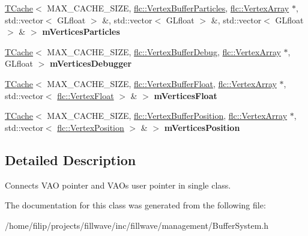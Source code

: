 \begin{DoxyCompactItemize}
\item 
\mbox{\label{structflw_1_1flf_1_1BufferSystem_a75dd883faa9d491424ab2a8dcb75abee}} 
\hyperlink{structflw_1_1flf_1_1TCache}{T\+Cache}$<$ M\+A\+X\+\_\+\+C\+A\+C\+H\+E\+\_\+\+S\+I\+ZE, \hyperlink{classflw_1_1flc_1_1VertexBufferParticles}{flc\+::\+Vertex\+Buffer\+Particles}, \hyperlink{classflw_1_1flc_1_1VertexArray}{flc\+::\+Vertex\+Array} $\ast$, std\+::vector$<$ G\+Lfloat $>$ \&, std\+::vector$<$ G\+Lfloat $>$ \&, std\+::vector$<$ G\+Lfloat $>$ \& $>$ {\bfseries m\+Vertices\+Particles}
\item 
\mbox{\label{structflw_1_1flf_1_1BufferSystem_a36720b705108842100c58f19793c3878}} 
\hyperlink{structflw_1_1flf_1_1TCache}{T\+Cache}$<$ M\+A\+X\+\_\+\+C\+A\+C\+H\+E\+\_\+\+S\+I\+ZE, \hyperlink{classflw_1_1flc_1_1VertexBufferDebug}{flc\+::\+Vertex\+Buffer\+Debug}, \hyperlink{classflw_1_1flc_1_1VertexArray}{flc\+::\+Vertex\+Array} $\ast$, G\+Lfloat $>$ {\bfseries m\+Vertices\+Debugger}
\item 
\mbox{\label{structflw_1_1flf_1_1BufferSystem_a315fe65dc1c97c15215d09627a4d3463}} 
\hyperlink{structflw_1_1flf_1_1TCache}{T\+Cache}$<$ M\+A\+X\+\_\+\+C\+A\+C\+H\+E\+\_\+\+S\+I\+ZE, \hyperlink{classflw_1_1flc_1_1VertexBufferFloat}{flc\+::\+Vertex\+Buffer\+Float}, \hyperlink{classflw_1_1flc_1_1VertexArray}{flc\+::\+Vertex\+Array} $\ast$, std\+::vector$<$ \hyperlink{structflw_1_1flc_1_1VertexFloat}{flc\+::\+Vertex\+Float} $>$ \& $>$ {\bfseries m\+Vertices\+Float}
\item 
\mbox{\label{structflw_1_1flf_1_1BufferSystem_aa90f229de2f3f3237ae6328d170b9dd0}} 
\hyperlink{structflw_1_1flf_1_1TCache}{T\+Cache}$<$ M\+A\+X\+\_\+\+C\+A\+C\+H\+E\+\_\+\+S\+I\+ZE, \hyperlink{classflw_1_1flc_1_1VertexBufferPosition}{flc\+::\+Vertex\+Buffer\+Position}, \hyperlink{classflw_1_1flc_1_1VertexArray}{flc\+::\+Vertex\+Array} $\ast$, std\+::vector$<$ \hyperlink{structflw_1_1flc_1_1VertexPosition}{flc\+::\+Vertex\+Position} $>$ \& $>$ {\bfseries m\+Vertices\+Position}
\end{DoxyCompactItemize}


\subsection{Detailed Description}
Connects V\+AO pointer and V\+AO\textquotesingle{}s user pointer in single class. 

The documentation for this class was generated from the following file\+:\begin{DoxyCompactItemize}
\item 
/home/filip/projects/fillwave/inc/fillwave/management/Buffer\+System.\+h\end{DoxyCompactItemize}
